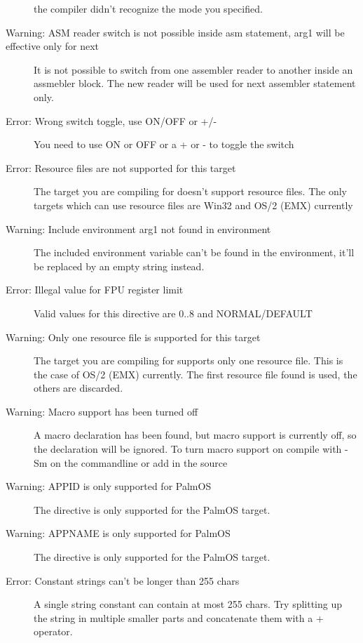 \begin{description}
 the compiler didn't recognize the mode you specified.
\item [Warning: ASM reader switch is not possible inside asm statement, arg1 will be effective only for next]
 It is not possible to switch from one assembler reader to another
 inside an assmebler block. The new reader will be used for next
 assembler statement only.
\item [Error: Wrong switch toggle, use ON/OFF or +/-]
 You need to use ON or OFF or a + or - to toggle the switch
\item [Error: Resource files are not supported for this target]
 The target you are compiling for doesn't support resource files. The
 only targets which can use resource files are Win32 and OS/2 (EMX) currently
\item [Warning: Include environment arg1 not found in environment]
 The included environment variable can't be found in the environment, it'll
 be replaced by an empty string instead.
\item [Error: Illegal value for FPU register limit]
 Valid values for this directive are 0..8 and NORMAL/DEFAULT
\item [Warning: Only one resource file is supported for this target]
 The target you are compiling for supports only one resource file. This is the
 case of OS/2 (EMX) currently. The first resource file found is used, the
 others are discarded.
\item [Warning: Macro support has been turned off]
 A macro declaration has been found, but macro support is currently off,
 so the declaration will be ignored. To turn macro support on compile with
 -Sm on the commandline or add  in the source
\item [Warning: APPID is only supported for PalmOS]
 The  directive is only supported for the PalmOS target.
\item [Warning: APPNAME is only supported for PalmOS]
 The  directive is only supported for the PalmOS target.
\item [Error: Constant strings can't be longer than 255 chars]
 A single string constant can contain at most 255 chars. Try splitting up the
 string in multiple smaller parts and concatenate them with a + operator.
 \end{description}
